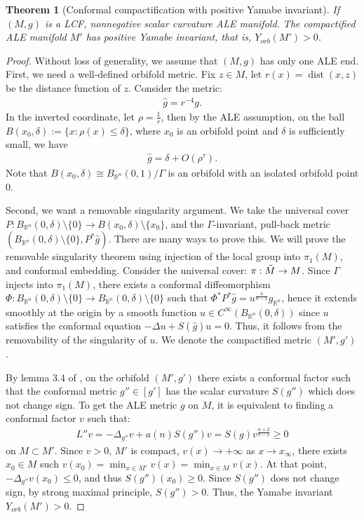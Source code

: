 \documentclass[12pt]{amsart}
\newtheorem{theorem}{Theorem}[section]
\theoremstyle{definition}
\begin{document}
\begin{theorem}[Conformal compactification with positive Yamabe invariant]\label{positive yamabe}If $(M,g)$ is a LCF,
nonnegative scalar curvature ALE manifold. 
The compactified ALE manifold $M'$ has positive Yamabe invariant, that is, $Y_{orb}(M')>0$.
    
\end{theorem}
\begin{proof}
    Without loss of generality, we assume that $(M,g)$ has only one ALE end. First, we need a well-defined orbifold metric. Fix $z\in M$, let $r(x)=\operatorname{dist}(x,z)$ be the distance function of $z$. Consider the metric:
\begin{align*}
    \hat{g}=r^{-4}g.
\end{align*}
In the inverted coordinate, let $\rho=\frac{1}{r}$, then by the ALE assumption, on the ball $B(x_0,\delta):=\{x:\rho(x)\leq \delta\}$, where $x_0$ is an orbifold point and $\delta$ is sufficiently small, we have 
\begin{align*}
    \hat{g}=\delta+O(\rho^{\tau}).
\end{align*}
Note that $B(x_0,\delta)\cong B_{\mathbb{R}^n}(0,1)/\Gamma$ is an orbifold with an isolated orbifold point $0$.

Second, we want a removable singularity argument.  We take the universal cover $P: B_{\mathbb{R}^n}(0,\delta) \setminus \{0\}\to B(x_0,\delta)\setminus\{x_0\}$, and the $\Gamma$-invariant, pull-back metric $(B_{\mathbb{R}^n}(0,\delta)\setminus\{0\}, P^* \hat{g})$. There are many ways to prove this. We will prove the removable singularity theorem using injection of the local group into $\pi_1(M)$, and conformal embedding. 
Consider the universal cover: $\pi: \Tilde{M}\to M$. Since $\Gamma$ injects into $\pi_1(M)$, there exists a conformal diffeomorphism $\Phi:B_{\mathbb{R}^n}(0,\delta)\setminus\{0\}\to B_{\mathbb{R}^n}(0,\delta)\setminus\{0\}$ such that $\Phi^* P^* \hat{g}=u^{\frac{4}{n-2}}g_{\mathbb{R}^n}$, hence it extends smoothly at the origin by a smooth function $u\in C^\infty(B_{\mathbb{R}^n}(0,\delta))$ since $u$ satisfies the conformal equation $-\Delta u + S(\hat{g}) u = 0$. Thus, it follows from the removability of the singularity of $u$. We denote the compactified metric $(M',g')$. 



By lemma 3.4 of \cite{AB04}, on the orbifold $(M',g')$ there exists a conformal factor such that the conformal metric $g''\in[g']$ has the scalar curvature $S(g'')$ which does not change sign. To get the ALE metric $g$ on $M$, it is equivalent to finding a conformal factor $v$ such that:
\begin{align*}
    L'' v=-\Delta_{g''} v+ a(n) S(g'')v=S(g) v^{\frac{n+2}{n-2}}\geq 0
\end{align*}
on $M\subset M'$. Since $v>0$, $M'$ is compact, $v(x)\to +\infty$ as $x\to x_\infty$, there exists $x_0\in M$ such $v(x_0)=\min_{x\in M'} v(x)=\min_{x\in M} v(x)$. At that point, $-\Delta_{g''}v(x_0)\leq0$, and thus $S(g'')(x_0)\geq0$. Since $S(g'')$ does not change sign, by strong maximal principle, $S(g'')>0$. Thus, the Yamabe invariant $Y_{orb}(M')>0$. 

\end{proof}
\end{document}

